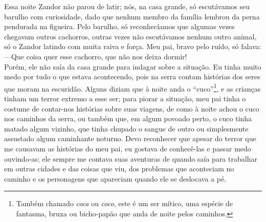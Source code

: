Essa noite Zandor não parou de latir; nós, na casa grande, só escutávamos seu barulho com curiosidade, dado que nenhum membro da família lembrou da perna pendurada na figueira. 
Pelo barulho, só reconhecíamos que algumas vezes chegavam outros cachorros, outras vezes não escutávamos nenhum outro animal, só o Zandor latindo com muita raiva e força. 
Meu pai, bravo pelo ruído, só falava:\\\indent
---Que coisa quer esse cachorro, que não nos deixa dormir!\\\indent
Porém, ele não saía da casa grande para indagar sobre a situação. 
Eu tinha muito medo por tudo o que estava acontecendo, pois na serra contam histórias dos seres que moram na escuridão. 
Alguns diziam que à noite anda o ``cuco''\footnote{Também chamado \textit{coca} ou \textit{coco}, este é um ser mítico, uma espécie de fantasma, bruxa ou bicho-papão que anda de noite pelos caminhos.}, 
e as crianças tinham um terror extremo a esse ser; para piorar a situação, meu pai tinha o costume de contar-nos histórias sobre suas viagens, de como à noite achou o cuco nos caminhos da serra, 
ou também que, em algum povoado perto, o cuco tinha matado algum vizinho, que tinha chupado o sangue de outro ou simplesmente assustado algum caminhante noturno. 
Devo reconhecer que apesar do terror que me causavam as histórias do meu pai, eu gostava de conhecê-las e passar medo ouvindo-as; 
ele sempre me contava suas aventuras de quando saía para trabalhar em outras cidades e das coisas que viu, dos problemas que aconteciam no caminho e os personagens que apareciam quando ele se deslocava a pé.

